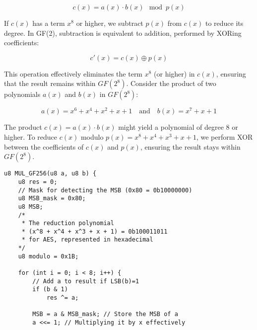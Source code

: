 \begin{itemize}
\begin{note}
\begin{itemize}
				\[
				c(x) = a(x) \cdot b(x) \mod p(x)
				\]
				
				If \( c(x) \) has a term \( x^8 \) or higher, we subtract \( p(x) \) from \( c(x) \) to reduce its degree. In GF(2), subtraction is equivalent to addition, performed by XORing coefficients:
				
				\[
				c'(x) = c(x) \oplus p(x)
				\]
				
				This operation effectively eliminates the term \( x^8 \) (or higher) in \( c(x) \), ensuring that the result remains within $GF(2^8)$.
					Consider the product of two polynomials \( a(x) \) and \( b(x) \) in $GF(2^8)$:
					
					\[
					a(x) = x^6 + x^4 + x^2 + x + 1 \quad \text{and} \quad b(x) = x^7 + x + 1
					\]
					
					The product \( c(x) = a(x) \cdot b(x) \) might yield a polynomial of degree 8 or higher. To reduce \( c(x) \) modulo \( p(x) = x^8 + x^4 + x^3 + x + 1 \), we perform XOR between the coefficients of \( c(x) \) and \( p(x) \), ensuring the result stays within $GF(2^8)$.
	\end{itemize}
	
%		
%		
%		
%		

%		
%		

%		
%		

\end{note}

	\newpage
	\begin{lstlisting}[style=C, caption={Multiplication in GF($2^8$)},captionpos=t]
u8 MUL_GF256(u8 a, u8 b) {
	u8 res = 0;
	// Mask for detecting the MSB (0x80 = 0b10000000)
	u8 MSB_mask = 0x80;
	u8 MSB;
	/*
	 * The reduction polynomial
	 * (x^8 + x^4 + x^3 + x + 1) = 0b100011011
	 * for AES, represented in hexadecimal
	*/
	u8 modulo = 0x1B;
	
	for (int i = 0; i < 8; i++) {
		// Add a to result if LSB(b)=1
		if (b & 1)
			res ^= a;
		
		MSB = a & MSB_mask; // Store the MSB of a
		a <<= 1; // Multiplying it by x effectively
		

\end{lstlisting}
\end{itemize}
